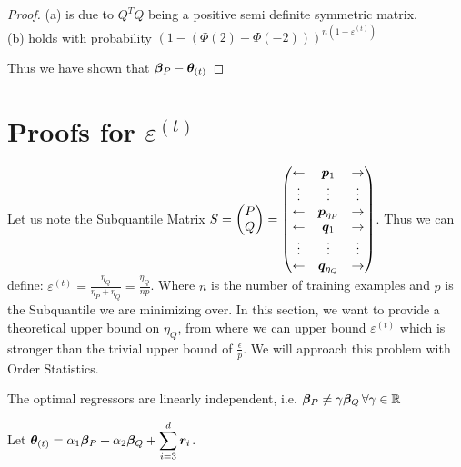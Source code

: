 \documentclass{article} %
\begin{document}
\begin{appendices}
\begin{proof}
	(a) is due to $Q^TQ$ being a positive semi definite symmetric matrix. \\ 
	(b) holds with probability $\left(1 - (\Phi(2) - \Phi(-2))\right)^{n(1-\varepsilon^{(t)})}$
	
	Thus we have shown that ${\bm{\beta}}_P - {\bm{\theta}}_{(t)}$
	
	\end{proof}

	\newpage
	
	\section{Proofs for $\varepsilon^{(t)}$}
	Let us note the Subquantile Matrix $\displaystyle S = \begin{pmatrix} P \\ Q \end{pmatrix} = \begin{pmatrix} \leftarrow & {\bm{p}}_1 & \rightarrow \\ \vdots & \vdots & \vdots \\ \leftarrow & {\bm{p}}_{\eta_P} & \rightarrow \\ \leftarrow & {\bm{q}}_1 & \rightarrow \\ \vdots & \vdots & \vdots \\ \leftarrow & {\bm{q}}_{\eta_Q} & \rightarrow\end{pmatrix}$. Thus we can define: $\displaystyle \varepsilon^{(t)} = \frac{\eta_Q}{\eta_P + \eta_Q} = \frac{\eta_Q}{np}$. Where $n$ is the number of training examples and $p$ is the Subquantile we are minimizing over. In this section, we want to provide a theoretical upper bound on $\eta_Q$, from where we can upper bound $\varepsilon^{(t)}$ which is stronger than the trivial upper bound of $\displaystyle \frac{\epsilon}{p}$. We will approach this problem with Order Statistics.
	\begin{assumption}
		The optimal regressors are linearly independent, i.e. ${\bm{\beta}}_P \neq \gamma {\bm{\beta}}_Q\, \forall \gamma \in \mathbb{R}$
	\end{assumption}
	Let $\displaystyle {\bm{\theta}}_{(t)} = \alpha_1 {\bm{\beta}}_P + \alpha_2 {\bm{\beta}}_Q + \sum_{i=3}^{d}{\bm{r}}_i$.
	

\end{appendices}
\end{document}

